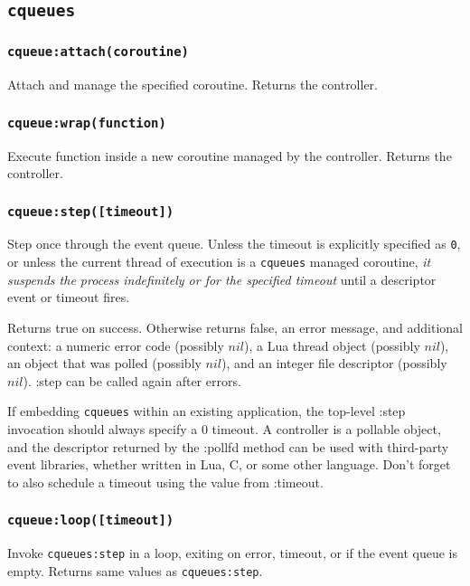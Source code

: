\documentclass[11pt, oneside]{memoir}
\newcommand*{\cqueues}[0]{\texttt{cqueues}\xspace}
\newcommand*{\routine}[1]{\texttt{#1}\xspace}
\newcommand*{\method}[1]{\texttt{#1}\xspace}
\newcounter{toccols}
\newenvironment{Module}[1]{
	\subsection{\texttt{#1}}
	\addtocontents{toc}{
		\protect\begin{multicols}{\value{toccols}}
	}
}{
	\addtocontents{toc}{\protect\end{multicols}}
}
\begin{document}
\begin{Module}{\cqueues}
\subsubsection[\routine{cqueues:attach}]{\routine{cqueue:attach(coroutine)}}
Attach and manage the specified coroutine. Returns the controller.

\subsubsection[\routine{cqueues:wrap}]{\routine{cqueue:wrap(function)}}
Execute function inside a new coroutine managed by the controller. Returns the controller.

\subsubsection[\routine{cqueues:step}]{\routine{cqueue:step([timeout])}}
Step once through the event queue. Unless the timeout is explicitly specified as \texttt{0}, or unless the current thread of execution is a \cqueues managed coroutine, \emph{it suspends the process indefinitely or for the specified timeout} until a descriptor event or timeout fires.

Returns true on success. Otherwise returns false, an error message, and additional context: a numeric error code (possibly $nil$), a Lua thread object (possibly $nil$), an object that was polled (possibly $nil$), and an integer file descriptor (possibly $nil$). :step can be called again after errors.

If embedding \cqueues within an existing application, the top-level :step invocation should always specify a 0 timeout. A controller is a pollable object, and the descriptor returned by the :pollfd method can be used with third-party event libraries, whether written in Lua, C, or some other language. Don't forget to also schedule a timeout using the value from :timeout.


\subsubsection[\routine{cqueues:loop}]{\routine{cqueue:loop([timeout])}}

Invoke \method{cqueues:step} in a loop, exiting on error, timeout, or if the event queue is empty. Returns same values as \method{cqueues:step}.


\end{Module}
\end{document}

